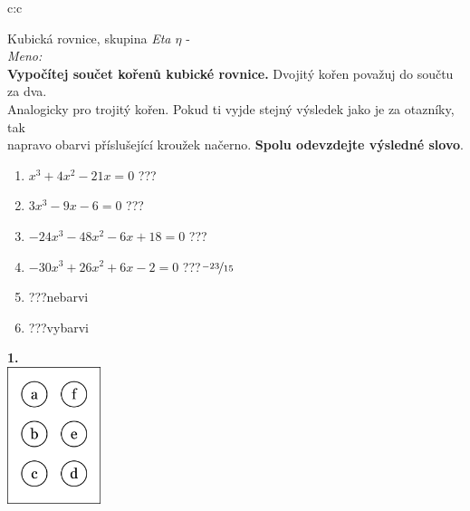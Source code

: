 \documentclass[10pt]{report}
\begin{document}
\begin{tabular}{c:c}
\begin{minipage}[c][99mm][t]{0.49\linewidth}
\begin{center}
\vspace{7mm}
{\huge Kubická rovnice, skupina \textit{Eta $\eta$} -}\\[4.5mm]
\textit{Meno:}\phantom{xxxxxxxxxxxxxxxxxxxxxxxxxxxxxxxxxxxxxxxxxxxxxxxxxxxxxxxxxxxxxxxxx}\\[3.5mm]
\textbf{Vypočítej součet kořenů kubické rovnice.} Dvojitý kořen považuj do součtu za dva.\\Analogicky pro trojitý kořen. Pokud ti vyjde stejný výsledek jako je za otazníky, tak\\napravo obarvi příslušející kroužek načerno. \textbf{Spolu odevzdejte výsledné slovo}.\\[3mm]
\begin{minipage}{0.77\linewidth}
\begin{center}
\begin{varwidth}{\textwidth}
\begin{enumerate}
\large
\item $x^3+4x^2-21x=0$\quad \dotfill\; ???\;\dotfill {}
\item $3x^3-9x-6=0$\quad \dotfill\; ???\;\dotfill {}
\item $-24x^3-48x^2-6x+18=0$\quad \dotfill\; ???\;\dotfill {}
\item $-30x^3+26x^2+6x-2=0$\quad \dotfill\; ???\;\dotfill \quad $\nicefrac{-23}{15}$
\item \quad \dotfill\; ???\;\dotfill \quad nebarvi
\item \quad \dotfill\; ???\;\dotfill \quad vybarvi
\end{enumerate}
\end{varwidth}
\end{center}
\end{minipage}
\begin{minipage}{0.20\linewidth}
\begin{center}
{\Huge\bfseries 1.} \\[2mm]
\includegraphics[height=40mm]{../images/braille.png}

\end{center}
\end{minipage}
\end{center}
\end{minipage}
\end{tabular}
\end{document}
